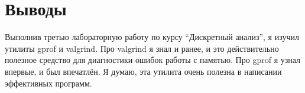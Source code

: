 \section{Выводы}
Выполнив третью лабораторную работу по курсу \enquote{Дискретный анализ}, я изучил утилиты {\ttfamily gprof} и {\ttfamily valgrind}. Про {\ttfamily valgrind} я знал и ранее, и это действительно полезное средство для диагностики ошибок работы с памятью. Про {\ttfamily gprof} я узнал впервые, и был впечатлён. Я думаю, эта утилита очень полезна в написании эффективных программ.
\pagebreak
